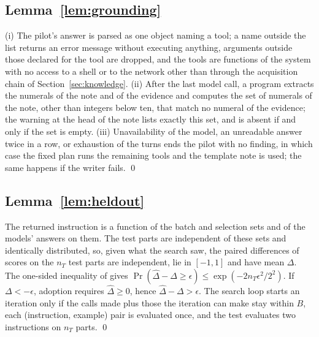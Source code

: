 \subsection*{Lemma~\ref{lem:grounding}}
(i) The pilot's answer is parsed as one object naming a tool; a name outside the list returns an error message
without executing anything, arguments outside those declared for the tool are dropped, and the tools are
functions of the system with no access to a shell or to the network other than through the acquisition chain of
Section~\ref{sec:knowledge}. (ii) After the last model call, a program extracts the numerals of the note and of
the evidence and computes the set of numerals of the note, other than integers below ten, that match no numeral of
the evidence; the warning at the head of the note lists exactly this set, and is absent if and only if the set is
empty. (iii) Unavailability of the model, an unreadable answer twice in a row, or exhaustion of the turns ends the
pilot with no finding, in which case the fixed plan runs the remaining tools and the template note is used; the
same happens if the writer fails. \qed

\subsection*{Lemma~\ref{lem:heldout}}
The returned instruction is a function of the batch and selection sets and of the models' answers on them. The test
parts are independent of these sets and identically distributed, so, given what the search saw, the paired
differences of scores on the $n_T$ test parts are independent, lie in $[-1,1]$ and have mean $\Delta$. The
one-sided inequality of \citet{hoeffding1963} gives
$\Pr(\hat\Delta-\Delta\ge\epsilon)\le\exp(-2n_T\epsilon^2/2^2)$. If $\Delta<-\epsilon$, adoption requires
$\hat\Delta\ge0$, hence $\hat\Delta-\Delta>\epsilon$. The search loop starts an iteration only if the calls made
plus those the iteration can make stay within $B$, each (instruction, example) pair is evaluated once, and the
test evaluates two instructions on $n_T$ parts. \qed
